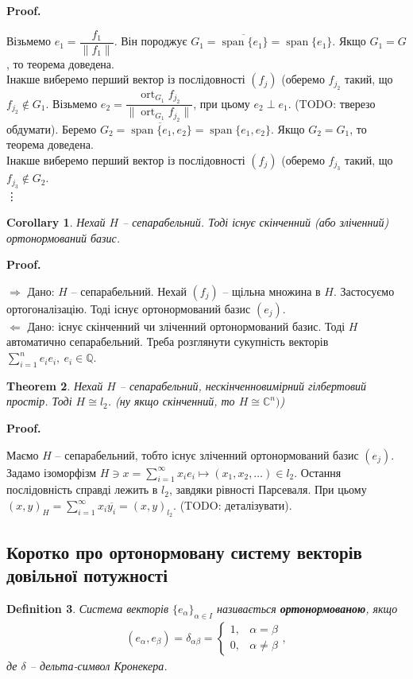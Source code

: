 \documentclass[a4paper, 10pt]{article}
\makeatletter
\def\rightproof{$\boxed{\Rightarrow}$ }
\def\leftproof{$\boxed{\Leftarrow}$ }
\theoremstyle{theoremdd}
\newtheorem{theorem}{Theorem}[subsection]
\theoremstyle{theoremdd}
\newtheorem{definition}[theorem]{Definition}
\theoremstyle{theoremdd}
\theoremstyle{theoremdd}
\theoremstyle{theoremdd}
\theoremstyle{theoremdd}
\theoremstyle{theoremdd}
\theoremstyle{theoremdd}
\newtheorem{corollary}[theorem]{Corollary}
\DeclareMathOperator{\ort}{ort}
\renewenvironment{proof}[1][Proof.\\]{\par
\pushQED{\hfill \qed}%
\normalfont \topsep6\p@\@plus6\p@\relax
\trivlist
\item\relax
{\bfseries
#1\@addpunct{.}}\hspace\labelsep\ignorespaces
}{%
\popQED\endtrivlist\@endpefalse
}
\DeclareMathOperator{\linspan}{span}
\makeatother
\begin{document}
\begin{proof}
Візьмемо $e_1 = \dfrac{f_1}{\|f_1\|}$. Він породжує $G_1 = \overline{\linspan\{e_1\}} = \linspan\{e_1\}$. Якщо $G_1 = G$, то теорема доведена.\\
Інакше виберемо перший вектор із послідовності $(f_j)$ (оберемо $f_{j_2}$ такий, що $f_{j_2} \notin G_1$. Візьмемо $e_2 = \dfrac{\ort_{G_1} f_{j_2}}{\| \ort_{G_1} f_{j_2}\|}$, при цьому $e_2 \perp e_1$. (TODO: тверезо обдумати). Беремо $G_2 = \overline{\linspan\{e_1,e_2\}} = \linspan\{e_1,e_2\}$. Якщо $G_2 = G_1$, то теорема доведена.\\
Інакше виберемо перший вектор із послідовності $(f_j)$ (оберемо $f_{j_3}$ такий, що $f_{j_3} \notin G_2$.\\
\vdots
\end{proof}

\begin{corollary}
Нехай $H$ -- сепарабельний. Тоді існує скінченний (або зліченний) ортонормований базис.
\end{corollary}

\begin{proof}
\rightproof Дано: $H$ -- сепарабельний. Нехай $(f_j)$ -- щільна множина в $H$. Застосуємо ортогоналізацію. Тоді існує ортонормований базис $(e_j)$.
\bigskip \\
\leftproof Дано: існує скінченний чи зліченний ортонормований базис. Тоді $H$ автоматично сепарабельний. Треба розглянути сукупність векторів $\displaystyle\sum_{i=1}^n e_i e_i,\ e_i \in \mathbb{Q}$.
\end{proof}

\begin{theorem}
Нехай $H$ -- сепарабельний, нескінченновимірний гілбертовий простір. Тоді $H \cong l_2$. (ну якщо скінченний, то $H \cong \mathbb{C}^n)$)
\end{theorem}

\begin{proof}
Маємо $H$ -- сепарабельний, тобто існує зліченний ортонормований базис $(e_j)$. Задамо ізоморфізм $H \ni x = \displaystyle\sum_{i=1}^\infty x_i e_i \mapsto (x_1,x_2,\dots) \in l_2$. Остання послідовність справді лежить в $l_2$, завдяки рівності Парсеваля. При цьому $(x,y)_H = \displaystyle\sum_{i=1}^\infty x_i \overline{y_i} = (x,y)_{l_2}$. (TODO: деталізувати).
\end{proof}
\fi

\subsection{Коротко про ортонормовану систему векторів довільної потужності}
\begin{definition}
Система векторів $\{e_\alpha\}_{\alpha \in I}$ називається \textbf{ортонормованою}, якщо
\begin{align*}
(e_\alpha,e_\beta) = \delta_{\alpha \beta} = \begin{cases} 1,& \alpha = \beta \\ 0, & \alpha \neq \beta \end{cases},
\end{align*}
де $\delta$ -- дельта-символ Кронекера.
\end{definition}
\end{document}

